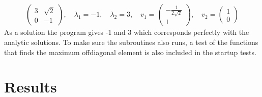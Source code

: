 \documentclass[a4paper,11pt]{article}
\begin{document}
{\begin{align}
\begin{pmatrix}
3 & \sqrt{2} \\
0 & -1 
\end{pmatrix}
, \quad \lambda_1 = -1, \quad \lambda_2 = 3, \quad v_1 = \begin{pmatrix}
-\frac{1}{2\sqrt{2}} \\
1
\end{pmatrix}, \quad v_2 = \begin{pmatrix}
1 \\
0
\end{pmatrix}
\end{align}
As a solution the program gives -1 and 3 which corresponds perfectly with the analytic solutions. To make sure the subroutines also runs, a test of the functions that finds the maximum offdiagonal element is also included in the startup tests. 






\section*{Results}
}
\end{document}
